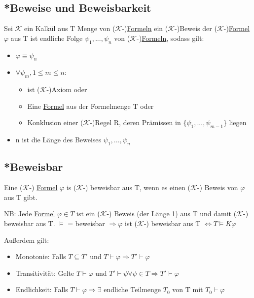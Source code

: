 \documentclass[12pt,a4paper]{article} %
\begin{document}
	\subsection{*Beweise und Beweisbarkeit}
	Sei $\mathcal{K}$ ein Kalkül aus T Menge von ($\mathcal{K}$-)\hyperref[Formel]{Formeln} ein ($\mathcal{K}$-)Beweis der ($\mathcal{K}$-)\hyperref[Formel]{Formel} $\varphi$ aus T ist endliche Folge $\psi_1, ..., \psi_n$ von ($\mathcal{K}$-)\hyperref[Formel]{Formeln}, sodass gilt:
	\begin{itemize}
		\item $\varphi \equiv \psi_n$
		\item $\forall \psi_m, 1 \le m \le n:$ \begin{itemize}
		\item ist ($\mathcal{K}$-)Axiom oder
		\item Eine \hyperref[Formel]{Formel} aus der Formelmenge T oder
		\item Konklusion einer ($\mathcal{K}$-)Regel R, deren Prämissen in $\{\psi_1, ..., \psi_{m - 1}\}$ liegen
		\end{itemize}
		\item n ist die Länge des Beweises $\psi_1, ..., \psi_n$
	\end{itemize}

	\subsection{*Beweisbar}
	\label{Beweisbar}
	Eine ($\mathcal{K}$-) \hyperref[Formel]{Formel} $\varphi$ is ($\mathcal{K}$-) beweisbar aus T, wenn es einen ($\mathcal{K}$-) Beweis von $\varphi$ aus T gibt.
	
	NB: Jede \hyperref[Formel]{Formel} $\varphi \in T$ ist ein ($\mathcal{K}$-) Beweis (der Länge 1) aus T und damit
	($\mathcal{K}$-) beweisbar aus T.
	$\hyperref[Erfullbar]{\vDash}$ = beweisbar $\Rightarrow \varphi$ ist ($\mathcal{K}$-) beweisbar aus T $\Leftrightarrow T \hyperref[Erfullbar]{\vDash} K \varphi$
	
	Außerdem gilt:
	
	\begin{itemize}
		\item Monotonie: Falls $T \subseteq T'$ und $T \hyperref[Beweisbar]{\vdash} \varphi \Rightarrow T' \hyperref[Beweisbar]{\vdash} \varphi$
		\item Transitivität: Gelte $T \hyperref[Beweisbar]{\vdash} \varphi$ und $T' \hyperref[Beweisbar]{\vdash} \psi \forall \psi \in T \Rightarrow T' \hyperref[Beweisbar]{\vdash} \varphi$ 
		\item Endlichkeit: Falls $T \hyperref[Beweisbar]{\vdash} \varphi \Rightarrow \exists$ endliche Teilmenge $T_0$ von T mit $T_0 \hyperref[Beweisbar]{\vdash} \varphi$
	\end{itemize}
\end{document}

